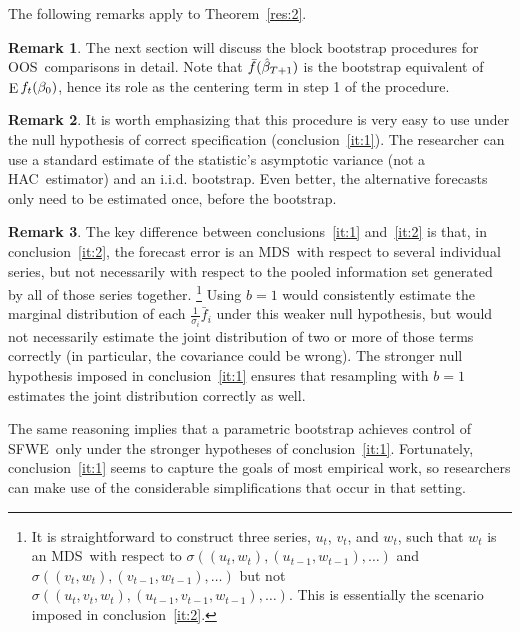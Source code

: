 \documentclass[12pt,fleqn]{article}
\theoremstyle{definition}
\newtheorem{rem}{Remark}
\DeclareMathOperator{\E}{E}
\newcommand{\btrue}[1][]{\if#1*\hat\beta_{T+1}\else\beta_0\fi}
\newcommand{\hac}{HAC}
\newcommand{\mds}{MDS}
\newcommand{\oos}{OOS}
\newcommand{\sfwe}{SFWE}
\begin{document}
The following remarks apply to Theorem~\ref{res:2}.

\begin{rem}
  The next section will discuss the block bootstrap procedures for
  \oos\ comparisons in detail.  Note that $\bar f(\btrue[*])$ is the
  bootstrap equivalent of $\E f_t(\btrue)$, hence its role as the
  centering term in step 1 of the procedure.
\end{rem}

\begin{rem}
It is worth emphasizing that this procedure is very easy to use under
the null hypothesis of correct specification (conclusion~\ref{it:1}).  The
researcher can use a standard estimate of the statistic's asymptotic
variance (not a \hac\ estimator) and an i.i.d. bootstrap.  Even
better, the alternative forecasts only need to be estimated once,
before the bootstrap.
\end{rem}

\begin{rem}\label{rem:2}
  The key difference between conclusions~\ref{it:1} and~\ref{it:2} is
  that, in conclusion~\ref{it:2}, the forecast error is an \mds\ with
  respect to several individual series, but not necessarily with
  respect to the pooled information set generated by all of those
  series together.%
\footnote{It is straightforward to construct three
    series, $u_t$, $v_t$, and $w_t$, such that $w_t$ is an \mds\ with
    respect to $\sigma((u_t, w_t), (u_{t-1}, w_{t-1}),\dots)$ and
    $\sigma((v_t, w_t), (v_{t-1}, w_{t-1}),\dots)$ but not
    $\sigma((u_t, v_t, w_t), (u_{t-1}, v_{t-1}, w_{t-1}),\dots)$.
    This is essentially the scenario imposed in conclusion~\ref{it:2}.} %
  Using $b = 1$ would consistently estimate the marginal distribution
  of each $\tfrac1{\sigma_i} \bar{f}_i$ under this weaker null
  hypothesis, but would not necessarily estimate the joint
  distribution of two or more of those terms correctly (in particular,
  the covariance could be wrong).  The stronger null hypothesis
  imposed in conclusion~\ref{it:1} ensures that resampling with $b = 1$
  estimates the joint distribution correctly as well.

  The same reasoning implies that a parametric bootstrap
  \citep[i.e.][]{ClM:12b} achieves control of \sfwe\ only under the
  stronger hypotheses of conclusion~\ref{it:1}.  Fortunately,
  conclusion~\ref{it:1} seems to capture the goals of most empirical work,
  so researchers can make use of the considerable simplifications that
  occur in that setting.
\end{rem}
\end{document}
